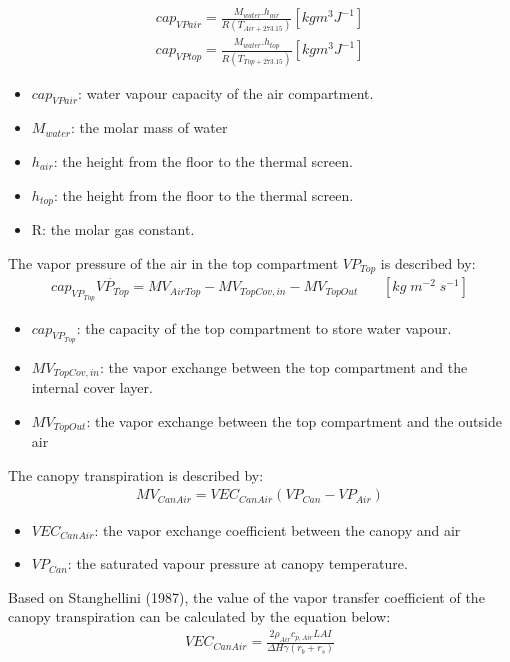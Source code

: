 \documentclass[a4paper]{article}
\numberwithin{equation}{section}
\begin{document}
\begin{align*}
    cap_{VPair} = \frac{M_{water}.h_{air}}{R(T_{Air+273.15})} [kgm^3J^{-1}]
\end{align*} 
\begin{align*}
    cap_{VPtop} = \frac{M_{water}.h_{top}}{R(T_{Top+273.15})} [kgm^3J^{-1}]
\end{align*}
\begin{itemize}
    \item \(cap_{VPair}\): water vapour capacity of the air compartment.
    \item \(M_{water}\): the molar mass of water
    \item \(h_{air}\):  the height from the floor to the thermal screen.
    \item \(h_{top}\):  the height from the floor to the thermal screen.
    \item R: the molar gas constant.
\end{itemize}
The vapor pressure of the air in the top compartment \(VP_{Top}\) is described by:
\begin{multline*}
  cap_{VP_{Top}}\dot{VP_{Top}} = MV_{AirTop} - MV_{TopCov,in} - MV_{TopOut} ~~~~~~~~ [kg\;m^{-2}\;s^{-1}]
\end{multline*}
\begin{itemize}
    \item \(cap_{VP_{Top}}\): the capacity of the top compartment to store water vapour.
    \item \(MV_{TopCov,in}\): the vapor exchange between the top compartment and the internal cover layer.
    \item \(MV_{TopOut}\): the vapor exchange between the top compartment and the outside air
\end{itemize}
The canopy transpiration is described by:
\begin{align*}
  MV_{CanAir} = VEC_{CanAir}(VP_{Can} - VP_{Air})
\end{align*}
\begin{itemize}
    \item \(VEC_{CanAir}\): the vapor exchange coefficient between the canopy and air
    \item \(VP_{Can}\): the saturated vapour pressure at canopy temperature.
\end{itemize}
Based on Stanghellini (1987), the value of the vapor transfer coefficient of the canopy transpiration can be calculated by the equation below:
\begin{align*}
  VEC_{CanAir} = \frac{2 \rho_{Air} c_{p,Air}LAI}{\Delta H \gamma (r_b + r_s)}
\end{align*}
\end{document}
